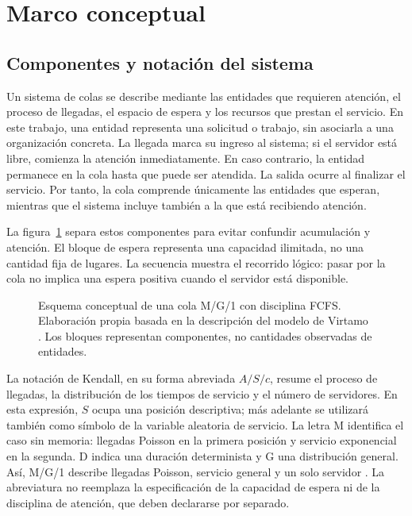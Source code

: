 
\section{Marco conceptual}
\label{sec:marco-conceptual}

\subsection{Componentes y notación del sistema}
\label{subsec:componentes-cola}

Un sistema de colas se describe mediante las entidades que requieren atención, el proceso de llegadas, el espacio de espera y los recursos que prestan el servicio. En este trabajo, una entidad representa una solicitud o trabajo, sin asociarla a una organización concreta. La llegada marca su ingreso al sistema; si el servidor está libre, comienza la atención inmediatamente. En caso contrario, la entidad permanece en la cola hasta que puede ser atendida. La salida ocurre al finalizar el servicio. Por tanto, la cola comprende únicamente las entidades que esperan, mientras que el sistema incluye también a la que está recibiendo atención.

La figura~\ref{fig:cola-un-servidor} separa estos componentes para evitar confundir acumulación y atención. El bloque de espera representa una capacidad ilimitada, no una cantidad fija de lugares. La secuencia muestra el recorrido lógico: pasar por la cola no implica una espera positiva cuando el servidor está disponible.

\begin{figure}[htbp]
  \centering
  
  \caption{Esquema conceptual de una cola M/G/1 con disciplina FCFS. Elaboración propia basada en la descripción del modelo de Virtamo \cite{virtamoMG1}. Los bloques representan componentes, no cantidades observadas de entidades.}
  \label{fig:cola-un-servidor}
\end{figure}

La notación de Kendall, en su forma abreviada $A/S/c$, resume el proceso de llegadas, la distribución de los tiempos de servicio y el número de servidores. En esta expresión, $S$ ocupa una posición descriptiva; más adelante se utilizará también como símbolo de la variable aleatoria de servicio. La letra M identifica el caso sin memoria: llegadas Poisson en la primera posición y servicio exponencial en la segunda. D indica una duración determinista y G una distribución general. Así, M/G/1 describe llegadas Poisson, servicio general y un solo servidor \cite{virtamoMG1}. La abreviatura no reemplaza la especificación de la capacidad de espera ni de la disciplina de atención, que deben declararse por separado.

